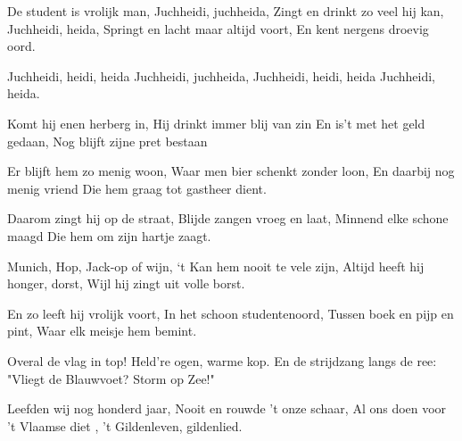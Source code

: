 
\beginverse
De student is vrolijk man,
Juchheidi, juchheida,
Zingt en drinkt zo veel hij kan,
Juchheidi, heida,
Springt en lacht maar altijd voort,
En kent nergens droevig oord.
\endverse

\beginchorus
Juchheidi, heidi, heida
Juchheidi, juchheida,
Juchheidi, heidi, heida
Juchheidi, heida.
\endchorus

\beginverse
Komt hij enen herberg in,
Hij drinkt immer blij van zin
En is't met het geld gedaan,
Nog blijft zijne pret bestaan
\endverse

\beginverse
Er blijft hem zo menig woon,
Waar men bier schenkt zonder loon,
En daarbij nog menig vriend
Die hem graag tot gastheer dient.
\endverse

\beginverse
Daarom zingt hij op de straat,
Blijde zangen vroeg en laat,
Minnend elke schone maagd
Die hem om zijn hartje zaagt.
\endverse

\beginverse
Munich, Hop, Jack-op of wijn,
‘t Kan hem nooit te vele zijn,
Altijd heeft hij honger, dorst,
Wijl hij zingt uit volle borst.
\endverse

\beginverse
En zo leeft hij vrolijk voort,
In het schoon studentenoord,
Tussen boek en pijp en pint,
Waar elk meisje hem bemint.
\endverse

\beginverse
Overal de vlag in top!
Held're ogen, warme kop.
En de strijdzang langs de ree:
"Vliegt de Blauwvoet? Storm op Zee!"
\endverse

\beginverse
Leefden wij nog honderd jaar,
Nooit en rouwde 't onze schaar,
Al ons doen voor 't Vlaamse diet ,
't Gildenleven, gildenlied. 
\endverse

\endsong
